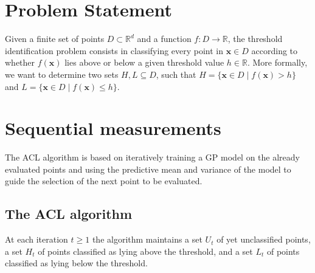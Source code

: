 \documentclass{article}
\def\*#1{\bm{#1}}
\newcommand{\acl}{\textsf{ACL}\xspace}
\begin{document}
 


\begin{abstract}\end{abstract} 


\section{Problem Statement}
Given a finite set of points $D \subset \mathbb{R}^d$ and a function
${f : D \to \mathbb{R}}$, the threshold identification problem consists in
classifying every point in $\*x \in D$ according to whether $f(\*x)$ lies
above or below a given threshold
value $h\in \mathbb{R}$. More formally, we want to determine two sets
$H, L \subseteq D$, such that
$H = \{\*x \in D \mid f(\*x) > h\}$ and $L = \{\*x \in D \mid f(\*x) \leq h\}$.

\section{Sequential measurements}
The \acl algorithm is based on iteratively training a GP model on the
already evaluated points and using the predictive mean and variance of the
model to guide the selection of the next point to be evaluated.

\subsection{The \acl algorithm}
At each iteration $t \geq 1$ the algorithm maintains a set $U_t$ of yet
unclassified points, a set $H_t$ of points classified as lying above
the threshold, and a set $L_t$ of points classified as lying below the
threshold.
\end{document}
